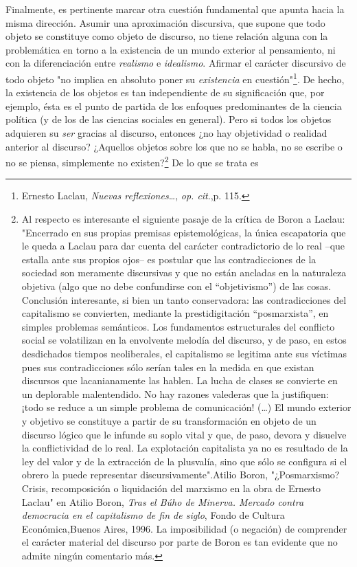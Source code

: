 \documentclass{book}
\begin{document}
Finalmente, es pertinente marcar otra cuestión fundamental que apunta
hacia la misma dirección. Asumir una aproximación discursiva, que supone
que todo objeto se constituye como objeto de discurso, no tiene relación
alguna con la problemática en torno a la existencia de un mundo exterior
al pensamiento, ni con la diferenciación entre \emph{realismo} e
\emph{idealismo}. Afirmar el carácter discursivo de todo objeto "no
implica en absoluto poner su \emph{existencia} en cuestión"\footnote{Ernesto
  Laclau, \emph{Nuevas reflexiones\ldots{}}, \emph{op. cit}.,p. 115.}.
De hecho, la existencia de los objetos es tan independiente de su
significación que, por ejemplo, ésta es el punto de partida de los
enfoques predominantes de la ciencia política (y de los de las ciencias
sociales en general). Pero si todos los objetos adquieren su \emph{ser}
gracias al discurso, entonces ¿no hay objetividad o realidad anterior al
discurso? ¿Aquellos objetos sobre los que no se habla, no se escribe o
no se piensa, simplemente no existen?\footnote{Al respecto es
  interesante el siguiente pasaje de la crítica de Boron a Laclau:
  "Encerrado en sus propias premisas epistemológicas, la única
  escapatoria que le queda a Laclau para dar cuenta del carácter
  contradictorio de lo real --que estalla ante sus propios ojos-- es
  postular que las contradicciones de la sociedad son meramente
  discursivas y que no están ancladas en la naturaleza objetiva (algo
  que no debe confundirse con el ``objetivismo'') de las cosas.
  Conclusión interesante, si bien un tanto conservadora: las
  contradicciones del capitalismo se convierten, mediante la
  prestidigitación ``posmarxista'', en simples problemas semánticos. Los
  fundamentos estructurales del conflicto social se volatilizan en la
  envolvente melodía del discurso, y de paso, en estos desdichados
  tiempos neoliberales, el capitalismo se legitima ante sus víctimas
  pues sus contradicciones sólo serían tales en la medida en que existan
  discursos que lacanianamente las hablen. La lucha de clases se
  convierte en un deplorable malentendido. No hay razones valederas que
  la justifiquen: ¡todo se reduce a un simple problema de comunicación!
  (\dots) El mundo exterior y objetivo se constituye a partir de su
  transformación en objeto de un discurso lógico que le infunde su soplo
  vital y que, de paso, devora y disuelve la conflictividad de lo real.
  La explotación capitalista ya no es resultado de la ley del valor y de
  la extracción de la plusvalía, sino que sólo se configura si el obrero
  la puede representar discursivamente".Atilio Boron, "¿Posmarxismo?
  Crisis, recomposición o liquidación del marxismo en la obra de Ernesto
  Laclau" en Atilio Boron, \emph{Tras el Búho de Minerva. Mercado contra
  democracia en el capitalismo de fin de siglo}, Fondo de Cultura
  Económica,Buenos Aires, 1996. La imposibilidad (o negación) de
  comprender el carácter material del discurso por parte de Boron es tan
  evidente que no admite ningún comentario más.} De lo que se trata es
\end{document}
